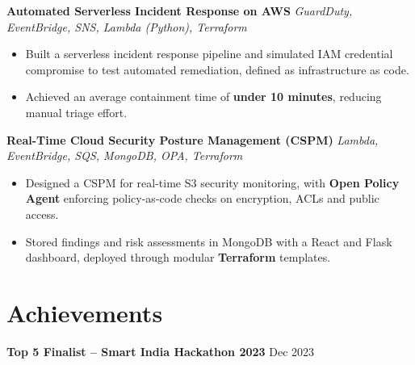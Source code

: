 \documentclass[11pt, a4paper]{article}
\begin{document}
\textbf{Automated Serverless Incident Response on AWS} \hfill \textit{GuardDuty, EventBridge, SNS, Lambda (Python), Terraform}

\begin{itemize}[label=-]
    \item Built a serverless incident response pipeline and simulated IAM credential compromise to test automated remediation, defined as infrastructure as code.

    \item Achieved an average containment time of \textbf{under 10 minutes}, reducing manual triage effort.
\end{itemize}

\textbf{Real-Time Cloud Security Posture Management (CSPM)} \hfill \textit{Lambda, EventBridge, SQS, MongoDB, OPA, Terraform}

\begin{itemize}[label=-]
    \item Designed a CSPM for real-time S3 security monitoring, with \textbf{Open Policy Agent} enforcing policy-as-code checks on encryption, ACLs and public access.

    \item Stored findings and risk assessments in MongoDB with a React and Flask dashboard, deployed through modular \textbf{Terraform} templates.
\end{itemize}


\section*{Achievements}

\textbf{Top 5 Finalist -- Smart India Hackathon 2023} \hfill Dec 2023
\end{document}
